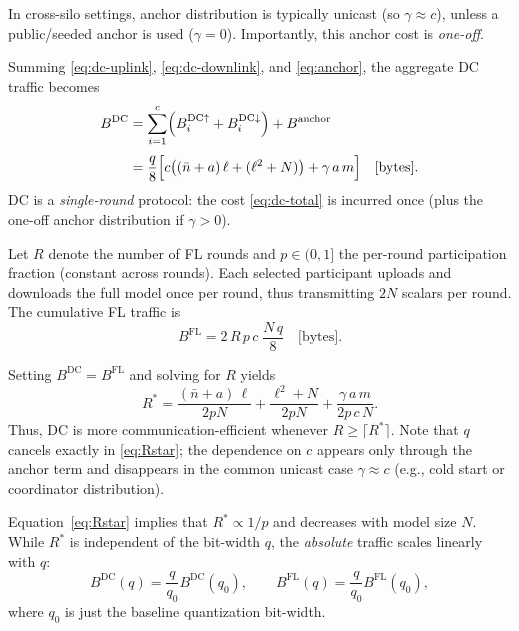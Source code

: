 \documentclass[final,3p,times]{elsarticle}
\theoremstyle{plain}
\begin{document}
In cross-silo settings, anchor distribution is typically unicast (so \(\gamma\approx c\)), unless a public/seeded anchor is
used (\(\gamma=0\)). Importantly, this anchor cost is \emph{one-off}.

Summing \eqref{eq:dc-uplink}, \eqref{eq:dc-downlink}, and \eqref{eq:anchor}, the aggregate DC traffic becomes
\begin{align}
    B^{\mathrm{DC}}
    &= \sum_{i=1}^{c}\Bigl(B^{\mathrm{DC}\uparrow}_{i}+B^{\mathrm{DC}\downarrow}_{i}\Bigr)+B^{\mathrm{anchor}}\notag\\[3pt]
    &= \frac{q}{8}\Bigl[c\bigl((\bar{n}+a)\,\ell+(\ell^{2}+N)\bigr)+\gamma\,a\,m\Bigr]
    \quad\text{[bytes]}.
    \label{eq:dc-total}
\end{align}
DC is a \emph{single-round} protocol: the cost \eqref{eq:dc-total} is incurred once (plus the one-off anchor
distribution if \(\gamma>0\)).

Let \(R\) denote the number of FL rounds and \(p\in(0,1]\) the per-round participation fraction (constant across rounds). Each selected participant uploads and downloads the full model once per round, thus transmitting \(2N\) scalars per round. The cumulative FL traffic is
\begin{equation}
    B^{\mathrm{FL}} = 2\,R\,p\,c \;\frac{N\,q}{8}
    \quad\text{[bytes]}.
    \label{eq:fl-total}
\end{equation}

Setting \(B^{\mathrm{DC}}=B^{\mathrm{FL}}\) and solving for \(R\) yields
\begin{equation}
    R^{*}
    = \frac{(\bar n+a)\,\ell}{2pN}
    + \frac{\ell^{2}+N}{2pN}
    + \frac{\gamma\,a\,m}{2p\,c\,N}.
    \label{eq:Rstar}
\end{equation}
Thus, DC is more communication-efficient whenever \(R \ge \lceil R^{*}\rceil\). Note that \(q\) cancels exactly in \eqref{eq:Rstar}; the dependence on \(c\) appears only through the anchor term and disappears in the common unicast case \(\gamma\approx c\) (e.g., cold start or coordinator distribution).

Equation~\eqref{eq:Rstar} implies that \(R^* \propto 1/p\) and decreases with model size \(N\). While \(R^*\) is independent of the bit-width \(q\), the \emph{absolute} traffic scales linearly with \(q\): 
\begin{equation}
B^{\mathrm{DC}}(q)=\frac{q}{q_0}B^{\mathrm{DC}}(q_0),
\qquad
B^{\mathrm{FL}}(q)=\frac{q}{q_0}B^{\mathrm{FL}}(q_0),
\end{equation}
where \(q_0\) is just the baseline quantization bit-width. 
\end{document}
